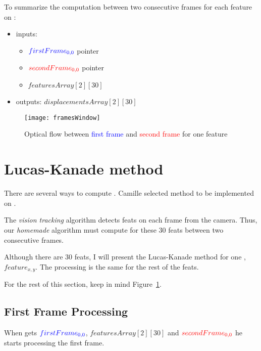 To summarize the \flow{} computation between two consecutive frames for each feature on \vc:
\begin{itemize}
	\item inputs:
		\begin{itemize}
			\item $\textcolor{blue}{firstFrame_{0,0}}$ pointer
			\item $\textcolor{red}{secondFrame_{0,0}}$ pointer
			\item {} $featuresArray[2][30]$
		\end{itemize}
	\item outputs:  $displacementsArray[2][30]$
\end{itemize}

\begin{figure}[!htbp]
	\centering
	\texttt{[image: framesWindow]}
	\caption{Optical flow between \textcolor{blue}{first frame} and \textcolor{red}{second frame} for one feature}
	\label{framesWindowFig}
\end{figure}
\FloatBarrier


\section{Lucas-Kanade method}

There are several ways to compute \flow{}. Camille selected  method to be implemented on \vc.

The \emph{vision tracking} algorithm detects  feat{}s on each frame from the camera. Thus, our \emph{homemade} algorithm must compute \flow{} for these 30 feat{}s between two consecutive frames.

Although there are 30 feat{}s, I will present the Lucas-Kanade method for one \feat{}, $feature_{x,y}$. The processing is the same for the rest of the feat{}s.

For the rest of this section, keep in mind Figure~\ref{framesWindowFig}.

\subsection{First Frame Processing}\label{gradientProcessing}

When \vc{} gets $\textcolor{blue}{firstFrame_{0,0}}$,  $featuresArray[2][30]$ and $\textcolor{red}{secondFrame_{0,0}}$ he starts processing the first frame.

